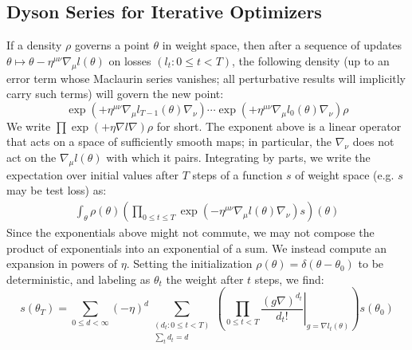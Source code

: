 \documentclass{article}
\begin{document}
    \subsection*{Dyson Series for Iterative Optimizers}
        If a density $\rho$ governs a point $\theta$ in weight space, then
        after a sequence of updates $\theta \mapsto \theta - \eta^{\mu\nu}
        \nabla_\mu l(\theta)$ on losses $(l_t: 0\leq t < T)$, the following
        density (up to an error term whose Maclaurin series vanishes; all
        perturbative results will implicitly carry such terms) will govern the
        new point:
        \begin{equation}\label{eq:descexp}
            \exp\left(+\eta^{\mu\nu} \nabla_\mu l_{T-1}(\theta) \nabla_\nu\right)
            \cdots
            \exp\left(+\eta^{\mu\nu} \nabla_\mu l_0(\theta) \nabla_\nu\right)
            \rho
        \end{equation}
        We write 
        $
            \prod \exp\left(+\eta \nabla l \nabla\right) \rho
        $
        for short.  The exponent above is a linear operator that acts on a
        space of sufficiently smooth maps; in particular, the $\nabla_\nu$ does
        not act on the $\nabla_\mu l(\theta)$ with which it pairs.  Integrating
        by parts, we write the expectation over initial values after $T$ steps
        of a function $s$ of weight space (e.g. $s$ may be test loss) as:
        \begin{align}\label{eq:contraexp}
            \int_\theta \rho(\theta) \left(
                \prod_{0 \leq t \leq T} \exp\left(
                    -\eta^{\mu\nu} \nabla_\mu l(\theta) \nabla_\nu
                \right) s
            \right)(\theta)
        \end{align}
        Since the exponentials above might not commute, we may not compose the
        product of exponentials into an exponential of a sum.  We instead
        compute an expansion in powers of $\eta$.  Setting the initialization
        $\rho(\theta) = \delta(\theta-\theta_0)$ to be deterministic, and
        labeling as $\theta_t$ the weight after $t$ steps, we find:
        \begin{equation}\label{eq:dyson}
            s(\theta_T) =
            \sum_{0\leq d < \infty} (-\eta)^d
            \sum_{\substack{(d_t: 0\leq t<T) \\ \sum_t d_t = d}}
            \left(
                \prod_{0 \leq t < T} \left.
                    \frac{(g \nabla)^{d_t}}{d_t!}
                \right|_{g=\nabla l_t(\theta)}
            \right) s (\theta_0)
        \end{equation}
    
\end{document}
